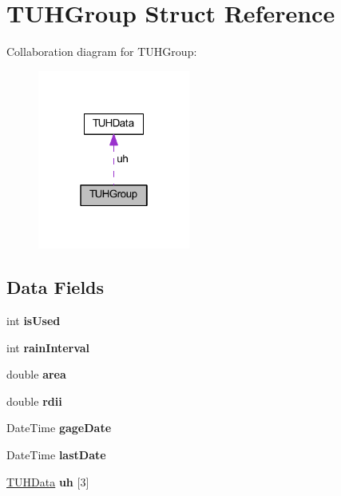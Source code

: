 \hypertarget{struct_t_u_h_group}{}\section{T\+U\+H\+Group Struct Reference}
\label{struct_t_u_h_group}


Collaboration diagram for T\+U\+H\+Group\+:
\nopagebreak
\begin{figure}[H]
\begin{center}
\leavevmode
\includegraphics[width=142pt]{da/d7e/struct_t_u_h_group__coll__graph}
\end{center}
\end{figure}
\subsection*{Data Fields}
\begin{DoxyCompactItemize}
\item 
\mbox{\label{struct_t_u_h_group_a19ad1ae7097bdcdfa630216d77f3bfb1}} 
int {\bfseries is\+Used}
\item 
\mbox{\label{struct_t_u_h_group_acd946bce6b233cbba9eafa53a438c921}} 
int {\bfseries rain\+Interval}
\item 
\mbox{\label{struct_t_u_h_group_ae517bffd82b9428b4f1d9500ea01c04f}} 
double {\bfseries area}
\item 
\mbox{\label{struct_t_u_h_group_a73906b57b3ce7156efcc12b8d435ebf5}} 
double {\bfseries rdii}
\item 
\mbox{\label{struct_t_u_h_group_ac811d071ca6a28c77239d67f4bffeb67}} 
Date\+Time {\bfseries gage\+Date}
\item 
\mbox{\label{struct_t_u_h_group_a5a9bd72b0ed4ff138fd5fa0d4c7c4f65}} 
Date\+Time {\bfseries last\+Date}
\item 
\mbox{\label{struct_t_u_h_group_a10f108697782096183362066c2e48ee1}} 
\hyperlink{struct_t_u_h_data}{T\+U\+H\+Data} {\bfseries uh} \mbox{[}3\mbox{]}
\end{DoxyCompactItemize}


